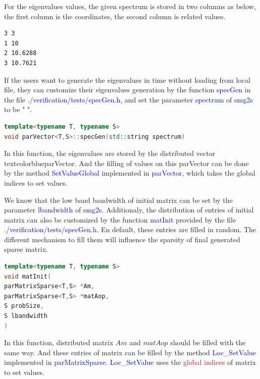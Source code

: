 For the eigenvalues values, the given spectrum is stored in two columns as below, the first column is the coordinates, the second column is related values.

\begin{lstlisting}[language=bash,frame=single]
%%MatrixMarket matrix coordinate real general
3 3
1 10
2 10.6288
3 10.7621
\end{lstlisting}

If the users want to generate the eigenvalues in time without loading from local file, they can customize their eigenvalues generation by the function \textcolor{blue}{specGen} in the file \textcolor{blue}{./verification/tests/specGen.h}, and set the parameter \textcolor{blue}{spectrum} of \textcolor{blue}{smg2s} to be \textcolor{blue}{" "}.

\begin{lstlisting}[language=C++,frame=single]
template<typename T, typename S>
void parVector<T,S>::specGen(std::string spectrum)
\end{lstlisting}

In this function, the eigenvalues are stored by the distributed vector textcolor{blue}{parVector}. And the filling of values on this parVector can be done by  the method \textcolor{blue}{SetValueGlobal} implemented in \textcolor{blue}{parVector}, which takes the global indices to set values.

We know that the low band bandwidth of initial matrix can be set by the parameter  \textcolor{blue}{lbandwidth} of \textcolor{blue}{smg2s}. Additionaly, the distribution of entries of initial matrix can also be customized by the function  \textcolor{blue}{matInit} provided by the file \textcolor{blue}{./verification/tests/specGen.h}. En default, these entries are filled in random. The different mechanism to fill them will influence the sparsity of final generated sparse matrix.

\begin{lstlisting}[language=C++,frame=single]
template<typename T, typename S>
void matInit(
parMatrixSparse<T,S> *Am, 
parMatrixSparse<T,S> *matAop, 
S probSize, 
S lbandwidth
)
\end{lstlisting}

In this function, distributed matrix $Am$ and $matAop$ should be filled with the same way. And these entries of matrix can be filled by the method \textcolor{blue}{Loc\_SetValue} implemented in \textcolor{blue}{parMatrixSparse}. \textcolor{blue}{Loc\_SetValue} uses the \textcolor{red}{global indices} of matrix to set values.

